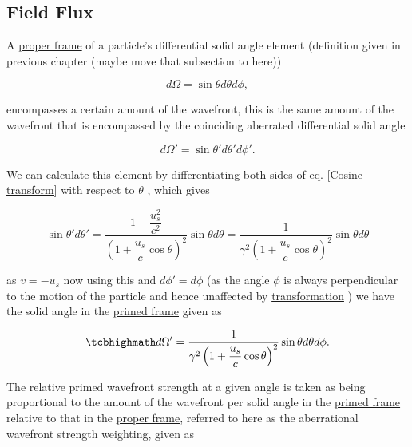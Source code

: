 \subsection{Field Flux}

A \hyperlink{def-proper-frame}{proper frame} of a particle's differential solid angle element (definition given in previous chapter (maybe move that subsection to here))

\begin{equation}
	d\Omega = \sin{\theta} d\theta d\phi,
\end{equation}

encompasses a certain amount of the wavefront, this is the same amount of the wavefront that is encompassed by the coinciding aberrated differential solid angle

\begin{equation}
	d\Omega' = \sin{\theta'} d\theta' d\phi'.
\end{equation}

We can calculate this element by differentiating both sides of eq. \eqref{Cosine transform} with respect to $\theta$ \cite{hogg1997special}, which gives

\begin{equation}
	\sin{\theta'} d\theta' = \dfrac{1-\dfrac{u_s^2}{c^2}}{\left(1+\dfrac{u_s}{c}\cos{\theta}\right)^2} \sin{\theta} d\theta = \dfrac{1}{\gamma^2\left(1+\dfrac{u_s}{c}\cos{\theta}\right)^2} \sin{\theta} d\theta
\end{equation}

as $v=-u_s$ now using this and $d\phi'=d\phi$ (as the angle $\phi$ is always perpendicular to the motion of the particle and hence unaffected by \hyperlink{def-transform}{transformation} ) we have the solid angle in the \hyperlink{def-Primed-Frame}{primed frame} given as

\begin{equation}
	\mhl{
		d\Omega' = \dfrac{1}{\gamma^2\left(1+\dfrac{u_s}{c}\cos{\theta}\right)^2} \sin{\theta} d\theta d\phi.
	}
\end{equation}

The relative primed wavefront strength at a given angle is taken as being proportional to the amount of the wavefront per solid angle in the \hyperlink{def-Primed-Frame}{primed frame} relative to that in the \hyperlink{def-proper-frame}{proper frame}, referred to here as the aberrational wavefront strength weighting, given as

